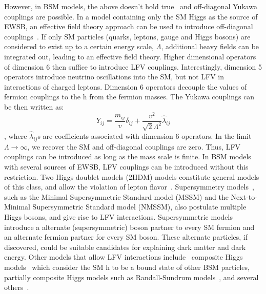 However, in BSM models, the above doesn't hold true~\cite{Harnik:2012pb} and off-diagonal Yukawa couplings are possible. In a model containing only the SM Higgs as the source of EWSB, an effective field theory approach can be used to introduce off-diagonal couplings~\cite{DiazCruz:1999xe}. If only SM particles (quarks, leptons, gauge and Higgs bosons) are considered to exist up to a certain energy scale, $\Lambda$, additional heavy fields can be integrated out, leading to an effective field theory. Higher dimensional operators of dimension 6 then suffice to introduce LFV couplings. Interestingly, dimension 5 operators introduce neutrino oscillations into the SM, but not LFV in interactions of charged leptons. Dimension 6 operators decouple the values of fermion couplings to the h from the fermion masses. The Yukawa couplings can be then written as:
\begin{equation*}
  Y_{ij}=\frac{m_{ij}}{v}\delta_{ij}+\frac{v^2}{\sqrt{2}\Lambda^2}\hat{\lambda}_{ij}
\end{equation*}
, where $\hat{\lambda}_{ij}$s are coefficients associated with dimension 6 operators. In the limit $\Lambda\rightarrow\infty$, we recover the SM and off-diagonal couplings are zero. Thus, LFV couplings can be introduced as long as the mass scale is finite.  In BSM models with several sources of EWSB, LFV couplings can be introduced without this restriction. Two Higgs doublet models (2HDM) models constitute general models of this class, and allow the violation of lepton flavor~\cite{PhysRevLett.38.622}. Supersymmetry models~\cite{Han:2000jz,Arganda:2004bz,Arhrib:2012ax,Arana-Catania:2013xma,Arganda:2015uca,Arganda:2015naa}, such as the Minimal Supersymmetric Standard model (MSSM) and the Next-to-Minimal Supersymmetric Standard model (NMSSM), also postulate multiple Higgs bosons, and give rise to LFV interactions. Supersymmetric models introduce a alternate (supersymmetric) boson partner to every SM fermion and an alternate fermion partner for every SM boson. These alternate particles, if discovered, could be suitable candidates for explaining dark matter and dark energy. Other models that allow LFV interactions include~\cite{HIG-17-001} composite Higgs models~\cite{Agashe:2009di,Azatov:2009na} which consider the SM h to be a bound state of other BSM particles, partially composite Higgs models such as Randall-Sundrum models~\cite{Perez:2008ee,Casagrande:2008hr,Buras:2009ka}, and several others~\cite{Blanke:2008zb,Giudice:2008uua,AguilarSaavedra:2009mx,Albrecht:2009xr,Goudelis:2011un,McKeen:2012av,Pilaftsis199268,PhysRevD.47.1080,Arganda:2014dta,Ishimori:2010au}.

